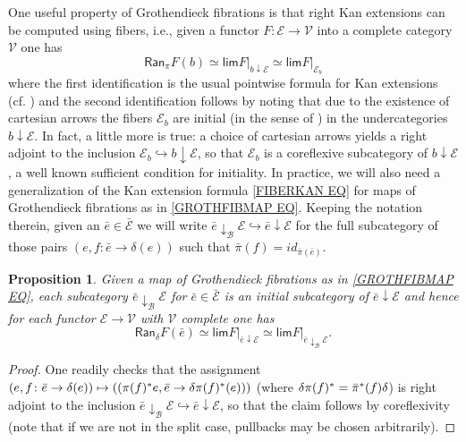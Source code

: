 \documentclass[a4paper,10pt
,draft
]{article}%
\numberwithin{equation}{section}
\numberwithin{figure}{section}
\newtheorem{proposition}[equation]{Proposition}%
\theoremstyle{definition} %
\newcommand{\1}{\ensuremath{\mathbbm 1}}%
\begin{document}
One useful property of Grothendieck fibrations is that
right Kan extensions can be computed using fibers, i.e., 
given a functor $F \colon \mathcal{E} \to \mathcal{V}$ into a complete category $\mathcal{V}$ one has
\begin{equation}\label{FIBERKAN EQ}
	\mathsf{Ran}_{\pi}F (b)
\simeq
	\mathsf{lim} F{|_{b \downarrow \mathcal{E}}}
\simeq
	\mathsf{lim} F|_{\mathcal{E}_b}
\end{equation}
where the first identification is the usual pointwise formula for Kan extensions (cf. \cite[X.3 Thm. 1]{McL})
and the second identification follows by noting that due to the existence of cartesian arrows the fibers
$\mathcal{E}_b$ are initial (in the sense of \cite[IX.3]{McL})
in the undercategories $b \downarrow \mathcal{E}$.
In fact, a little more is true: a choice of cartesian arrows 
yields a right adjoint to the inclusion
$\mathcal{E}_b \hookrightarrow b \downarrow \mathcal{E}$, so that $\mathcal{E}_b$ is a coreflexive subcategory of 
$b \downarrow \mathcal{E}$,
a well known sufficient condition for initiality.
In practice, we will also need a generalization of the Kan extension formula \eqref{FIBERKAN EQ} for maps of Grothendieck fibrations as in \eqref{GROTHFIBMAP EQ}.
Keeping the notation therein, given an $\bar{e} \in \bar{\mathcal{E}}$ we will write 
$\bar{e} \downarrow_{\mathcal{B}} \mathcal{E} \hookrightarrow
\bar{e} \downarrow \mathcal{E}$
for the full subcategory of those pairs 
$\left(e,f \colon \bar{e} \to \delta(e)\right)$
such that $\bar{\pi}(f) = id_{\bar{\pi}(\bar{e})}$.


\begin{proposition}\label{FIBERKANMAP PROP}
	Given a map of Grothendieck fibrations
	as in \eqref{GROTHFIBMAP EQ},
	each subcategory $\bar{e} \downarrow_{\mathcal{B}} \mathcal{E}$
	for $\bar{e} \in \bar{\mathcal{E}}$
	is an initial subcategory of $\bar{e} \downarrow \mathcal{E}$
	and hence for each functor 
	$\mathcal{E} \to \mathcal{V}$
	with $\mathcal{V}$ complete one has
\begin{equation}\label{FIBERKANMAP EQ}
	\mathsf{Ran}_{\delta}F (\bar{e})
\simeq
	\mathsf{lim} F{|_{\bar{e} \downarrow \mathcal{E}}}
\simeq
	\mathsf{lim} F|_{\bar{e} \downarrow_{\mathcal{B}} \mathcal{E}}.
\end{equation}	
\end{proposition}

\begin{proof}
One readily checks that the assignment
$
	(e,f\colon\bar{e} \to \delta(e))
\mapsto
	\left(
	(\pi(f)^{\**}e, \bar{e} \to \delta \pi(f)^{\**}(e))
	\right)
$
(where $\delta \pi(f)^{\**} = \bar{\pi}^{\**}(f) \delta$) is  right adjoint to the inclusion
$\bar{e} \downarrow_{\mathcal{B}} \mathcal{E} \hookrightarrow
\bar{e} \downarrow \mathcal{E}$, so that the claim follows by coreflexivity 
(note that if we are not in the split case, pullbacks may be chosen arbitrarily).
\end{proof}
\end{document}
